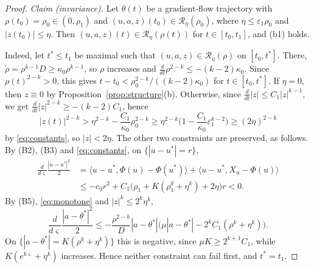 \documentclass[11pt]{article}
\theoremstyle{definition}
\theoremstyle{remark}
\numberwithin{equation}{section}
\newcommand{\cR}{\mathcal{R}}
\newcommand{\eps}{\varepsilon}
\newcommand{\ip}[2]{\langle #1,#2\rangle}
\begin{document}
\begin{proof}
\emph{Claim (invariance).} Let $\theta(t)$ be a gradient-flow trajectory with $\rho(t_0)=\rho_0\in(0,\rho_1)$ and $(u,a,z)(t_0)\in\cR_\eta(\rho_0)$, where $\eta\le\eps_1\rho_0$ and $|z(t_0)|\le\eta$. Then $(u,a,z)(t)\in\cR_\eta(\rho(t))$ for $t\in[t_0,t_1]$, and (b1) holds.

Indeed, let $t^*\le t_1$ be maximal such that $(u,a,z)\in\cR_\eta(\rho)$ on $[t_0,t^*]$. There, $\dot\rho=\rho^{k-1}D\ge\kappa_0\rho^{k-1}$, so $\rho$ increases and $\frac{d}{dt}\rho^{2-k}\le-(k-2)\kappa_0$. Since $\rho(t)^{2-k}>0$, this gives $t-t_0<\rho_0^{2-k}/((k-2)\kappa_0)$ for $t\in[t_0,t^*]$. If $\eta=0$, then $z\equiv0$ by Proposition~\ref{prop:structure}(b). Otherwise, since $\frac{d}{dt}|z|\le C_1|z|^{k-1}$, we get $\frac{d}{dt}|z|^{2-k}\ge-(k-2)C_1$, hence
\[
|z(t)|^{2-k}>\eta^{2-k}-\frac{C_1}{\kappa_0}\rho_0^{2-k}\ge\eta^{2-k}\Big(1-\frac{C_1}{\kappa_0}\eps_1^{k-2}\Big)\ge(2\eta)^{2-k}
\]
by \eqref{eq:constants}, so $|z|<2\eta$. The other two constraints are preserved, as follows. By (B2), (B3) and \eqref{eq:constants}, on $\{|u-u^*|=r\}$,
\begin{align*}
\frac{d}{d\varsigma}\frac{|u-u^*|^2}2&=\ip{u-u^*}{\Phi(u)-\Phi(u^*)}+\ip{u-u^*}{X_u-\Phi(u)}\\
&\le-c_0r^2+C_1\big(\rho_1+K(\rho_1^k+\eta^k)+2\eta\big)r<0 .
\end{align*}
By (B5), \eqref{eq:monotone} and $|z|^k\le2^k\eta^k$,
\[
\frac{d}{d\varsigma}\frac{|a-\theta^*|^2}2\le-\frac{\rho^{2-k}}{D}|a-\theta^*|\Big(\mu|a-\theta^*|-2^kC_1(\rho^k+\eta^k)\Big).
\]
On $\{|a-\theta^*|=K(\rho^k+\eta^k)\}$ this is negative, since $\mu K\ge2^{k+1}C_1$, while $K(e^{k\varsigma}+\eta^k)$ increases. Hence neither constraint can fail first, and $t^*=t_1$.


\end{proof}
\end{document}

